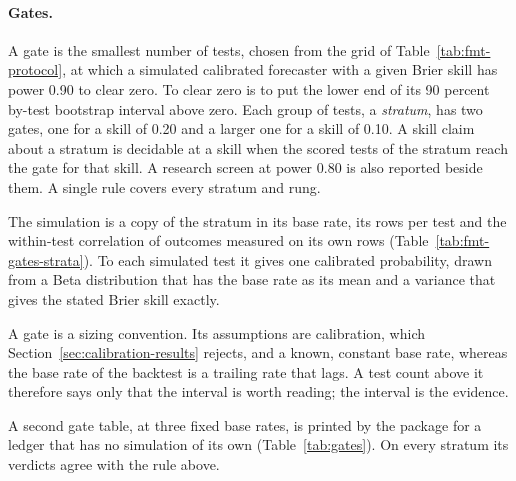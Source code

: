 \documentclass[sigconf,nonacm]{acmart}
\begin{document}
\paragraph{Gates.} A gate is the smallest number of tests, chosen from the grid of Table~\ref{tab:fmt-protocol}, at which a simulated calibrated forecaster with a given Brier skill has power 0.90 to clear zero. To clear zero is to put the lower end of its 90 percent by-test bootstrap interval above zero. Each group of tests, a \emph{stratum}, has two gates, one for a skill of 0.20 and a larger one for a skill of 0.10. A skill claim about a stratum is decidable at a skill when the scored tests of the stratum reach the gate for that skill. A research screen at power 0.80 is also reported beside them. A single rule covers every stratum and rung.

The simulation is a copy of the stratum in its base rate, its rows per test and the within-test correlation of outcomes measured on its own rows (Table~\ref{tab:fmt-gates-strata}). To each simulated test it gives one calibrated probability, drawn from a Beta distribution that has the base rate as its mean and a variance that gives the stated Brier skill exactly.

A gate is a sizing convention. Its assumptions are calibration, which Section~\ref{sec:calibration-results} rejects, and a known, constant base rate, whereas the base rate of the backtest is a trailing rate that lags. A test count above it therefore says only that the interval is worth reading; the interval is the evidence.

A second gate table, at three fixed base rates, is printed by the package for a ledger that has no simulation of its own (Table~\ref{tab:gates}). On every stratum its verdicts agree with the rule above.

\end{document}
